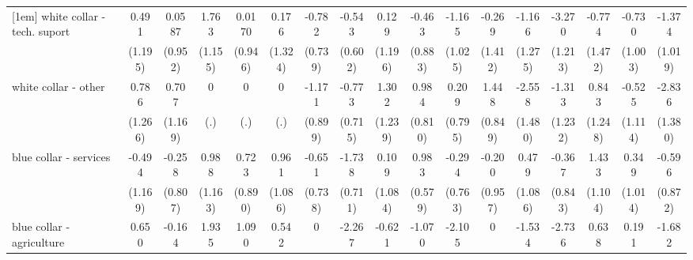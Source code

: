 {\begin{tabular}{l*{16}{c}}
[1em]
white collar - tech. suport&       0.491         &      0.0587         &       1.763         &      0.0170         &       0.176         &      -0.782         &      -0.543         &       0.129         &      -0.463         &      -1.165         &      -0.269         &      -1.166         &      -3.270\sym{**} &      -0.774         &      -0.730         &      -1.374         \\
                    &     (1.195)         &     (0.952)         &     (1.155)         &     (0.946)         &     (1.324)         &     (0.739)         &     (0.602)         &     (1.196)         &     (0.883)         &     (1.025)         &     (1.412)         &     (1.275)         &     (1.213)         &     (1.472)         &     (1.003)         &     (1.019)         \\
[1em]
white collar - other&       0.786         &       0.707         &           0         &           0         &           0         &      -1.171         &      -0.773         &       1.302         &       0.984         &       0.209         &       1.448         &      -2.558         &      -1.313         &       0.843         &      -0.525         &      -2.836\sym{*}  \\
                    &     (1.266)         &     (1.169)         &         (.)         &         (.)         &         (.)         &     (0.899)         &     (0.715)         &     (1.239)         &     (0.810)         &     (0.795)         &     (0.849)         &     (1.480)         &     (1.232)         &     (1.248)         &     (1.114)         &     (1.380)         \\
[1em]
blue collar - services&      -0.494         &      -0.258         &       0.988         &       0.723         &       0.961         &      -0.651         &      -1.738\sym{*}  &       0.109         &       0.983         &      -0.294         &      -0.200         &       0.479         &      -0.367         &       1.433         &       0.349         &      -0.596         \\
                    &     (1.169)         &     (0.807)         &     (1.163)         &     (0.890)         &     (1.086)         &     (0.738)         &     (0.711)         &     (1.084)         &     (0.579)         &     (0.763)         &     (0.957)         &     (1.086)         &     (0.843)         &     (1.104)         &     (1.014)         &     (0.872)         \\
[1em]
blue collar - agriculture&       0.650         &      -0.164         &       1.935         &       1.090         &       0.542         &           0         &      -2.267\sym{*}  &      -0.621         &      -1.070         &      -2.105         &           0         &      -1.534         &      -2.736\sym{*}  &       0.638         &       0.191         &      -1.682         \\

\end{tabular}}
